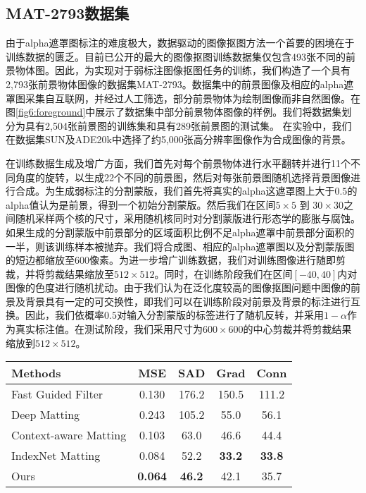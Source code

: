 \subsection{MAT-2793数据集}
\label{sec6:data}
由于alpha遮罩图标注的难度极大，数据驱动的图像抠图方法一个首要的困境在于训练数据的匮乏。目前已公开的最大的图像抠图训练数据集\cite{xu2017deep}仅包含493张不同的前景物体图。因此，为实现对于弱标注图像抠图任务的训练，我们构造了一个具有2,793张前景物体图像的数据集MAT-2793。数据集中的前景图像及相应的alpha遮罩图采集自互联网，并经过人工筛选，部分前景物体为绘制图像而非自然图像。在图\ref{fig6:foreground}中展示了数据集中部分前景物体图像的样例。我们将数据集划分为具有2,504张前景图的训练集和具有289张前景图的测试集。
在实验中，我们在数据集SUN\cite{xiao2010sun}及ADE20k\cite{zhou2017scene}中选择了约5,000张高分辨率图像作为合成图像的背景。

在训练数据生成及增广方面，我们首先对每个前景物体进行水平翻转并进行11个不同角度的旋转，以生成22个不同的前景图，然后对每张前景图随机选择背景图像进行合成。为生成弱标注的分割蒙版，我们首先将真实的alpha这遮罩图上大于$0.5$的alpha值认为是前景，得到一个初始分割蒙版。然后我们在区间$5\times5$ 到 $30\times30$之间随机采样两个核的尺寸，采用随机核同时对分割蒙版进行形态学的膨胀与腐蚀。如果生成的分割蒙版中前景部分的区域面积比例不足alpha遮罩中前景部分面积的一半，则该训练样本被抛弃。我们将合成图、相应的alpha遮罩图以及分割蒙版图的短边都缩放至600像素。为进一步增广训练数据，我们对训练图像进行随即剪裁，并将剪裁结果缩放至$512\times512$。同时，在训练阶段我们在区间$ [-40, 40] $内对图像的色度进行随机扰动。由于我们认为在泛化度较高的图像抠图问题中图像的前景及背景具有一定的可交换性，即我们可以在训练阶段对前景及背景的标注进行互换。因此，我们依概率$0.5$对输入分割蒙版的标签进行了随机反转，并采用$1-\alpha$作为真实标注值。在测试阶段，我们采用尺寸为$600\times600$的中心剪裁并将剪裁结果缩放到$512\times512$。

\begin{table}[t]
	\setlength{\tabcolsep}{16pt}
	\centering
	\begin{tabular}{lcccc}  
		\toprule
		Methods & MSE & SAD & Grad &Conn\\
		\midrule
		Fast Guided Filter \cite{he2015fast} &  0.130 & 176.2  & 150.5  & 111.2 \\
		Deep Matting \cite{xu2017deep} & 0.243 & 105.2 & 55.0 & 56.1\\
		Context-aware Matting \cite{hou2019context}  & 0.103  & 63.0  & 46.6  & 44.4 \\
		IndexNet Matting \cite{lu2019indices}  & 0.084 & 52.2 & \textbf{33.2} & \textbf{33.8}\\
		Ours & \textbf{0.064} & \textbf{46.2} & {42.1} & {35.7}\\        
		\bottomrule
	\end{tabular}
	\label{tab6:adobe}
\end{table}

